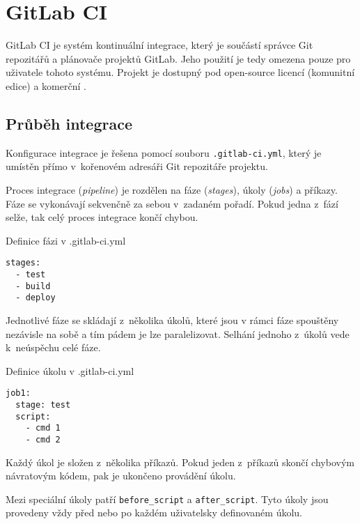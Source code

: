 \section{GitLab CI}

GitLab CI je systém kontinuální integrace, který je součástí správce Git repozitářů a plánovače projektů GitLab.
Jeho použití je tedy omezena pouze pro uživatele tohoto systému.
Projekt je dostupný pod open-source licencí (komunitní edice) a komerční \cite{gitlab_ce}. 

\subsection{Průběh integrace}


Konfigurace integrace je řešena pomocí souboru \verb|.gitlab-ci.yml|, který je umístěn přímo v~kořenovém adresáři Git repozitáře projektu.

Proces integrace (\textit{pipeline}) je rozdělen na fáze (\textit{stages}), úkoly (\textit{jobs}) a příkazy.
Fáze se vykonávají sekvenčně za sebou v~zadaném pořadí.
Pokud jedna z~fází selže, tak celý proces integrace končí chybou.

\begin{listing}[ht]
\caption{Definice fázi v .gitlab-ci.yml}
\begin{verbatim}
stages:
  - test
  - build
  - deploy
\end{verbatim}
\end{listing}

Jednotlivé fáze se skládají z~několika úkolů, které jsou v rámci fáze spouštěny nezávisle na sobě a tím pádem je lze paralelizovat.
Selhání jednoho z~úkolů vede k~neúspěchu celé fáze.

\begin{listing}[ht]
\caption{Definice úkolu v .gitlab-ci.yml}
\begin{verbatim}
job1:
  stage: test
  script:
    - cmd 1
    - cmd 2
\end{verbatim}
\end{listing}

Každý úkol je složen z~několika příkazů.
Pokud jeden z~příkazů skončí chybovým návratovým kódem, pak je ukončeno provádění úkolu.

Mezi speciální úkoly patří \verb|before_script| a \verb|after_script|.
Tyto úkoly jsou provedeny vždy před nebo po každém uživatelsky definovaném úkolu.

